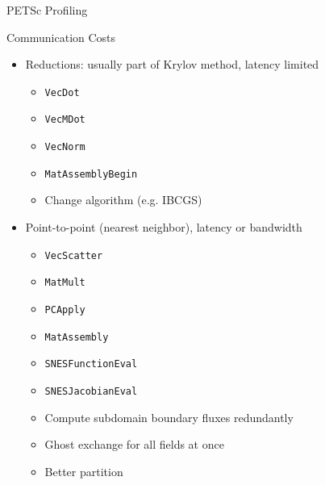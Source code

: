 \begin{frame}{PETSc Profiling}

\begin{block}{Communication Costs}
  \begin{itemize}
  \item Reductions: usually part of Krylov method, latency limited
    \begin{itemize}
    \item \lstinline|VecDot|
    \item \lstinline|VecMDot|
    \item \lstinline|VecNorm|
    \item \lstinline|MatAssemblyBegin|
    \item Change algorithm (e.g. IBCGS)
    \end{itemize}
  \item Point-to-point (nearest neighbor), latency or bandwidth
    \begin{itemize}
    \item \lstinline|VecScatter|
    \item \lstinline|MatMult|
    \item \lstinline|PCApply|
    \item \lstinline|MatAssembly|
    \item \lstinline|SNESFunctionEval|
    \item \lstinline|SNESJacobianEval|
    \item Compute subdomain boundary fluxes redundantly
    \item Ghost exchange for all fields at once
    \item Better partition
    \end{itemize}
  \end{itemize}
  \end{block}
\end{frame}
